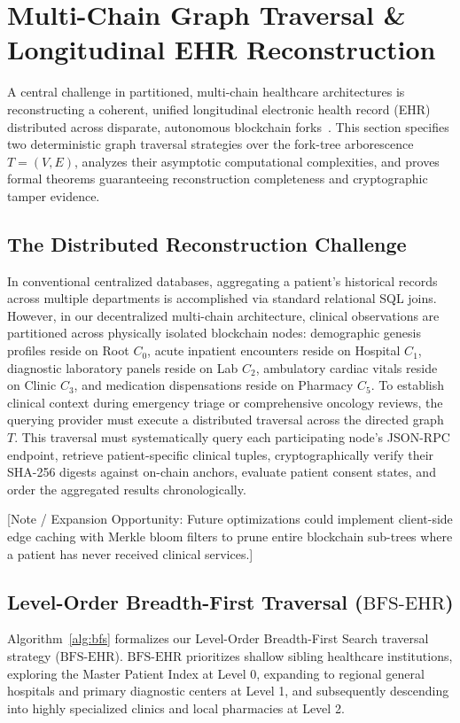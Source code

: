 \section{Multi-Chain Graph Traversal \& Longitudinal EHR Reconstruction}
\label{sec:traversal_algorithms}

A central challenge in partitioned, multi-chain healthcare architectures is reconstructing a coherent, unified longitudinal electronic health record (EHR) distributed across disparate, autonomous blockchain forks~\cite{cormen2022introduction}. This section specifies two deterministic graph traversal strategies over the fork-tree arborescence $T = (V,E)$, analyzes their asymptotic computational complexities, and proves formal theorems guaranteeing reconstruction completeness and cryptographic tamper evidence.

\subsection{The Distributed Reconstruction Challenge}
In conventional centralized databases, aggregating a patient's historical records across multiple departments is accomplished via standard relational SQL joins. However, in our decentralized multi-chain architecture, clinical observations are partitioned across physically isolated blockchain nodes: demographic genesis profiles reside on Root $C_0$, acute inpatient encounters reside on Hospital $C_1$, diagnostic laboratory panels reside on Lab $C_2$, ambulatory cardiac vitals reside on Clinic $C_3$, and medication dispensations reside on Pharmacy $C_5$. To establish clinical context during emergency triage or comprehensive oncology reviews, the querying provider must execute a distributed traversal across the directed graph $T$. This traversal must systematically query each participating node's JSON-RPC endpoint, retrieve patient-specific clinical tuples, cryptographically verify their SHA-256 digests against on-chain anchors, evaluate patient consent states, and order the aggregated results chronologically.

[Note / Expansion Opportunity: Future optimizations could implement client-side edge caching with Merkle bloom filters to prune entire blockchain sub-trees where a patient has never received clinical services.]

\subsection{Level-Order Breadth-First Traversal ($\text{BFS-EHR}$)}
Algorithm~\ref{alg:bfs} formalizes our Level-Order Breadth-First Search traversal strategy ($\text{BFS-EHR}$). $\text{BFS-EHR}$ prioritizes shallow sibling healthcare institutions, exploring the Master Patient Index at Level 0, expanding to regional general hospitals and primary diagnostic centers at Level 1, and subsequently descending into highly specialized clinics and local pharmacies at Level 2.

